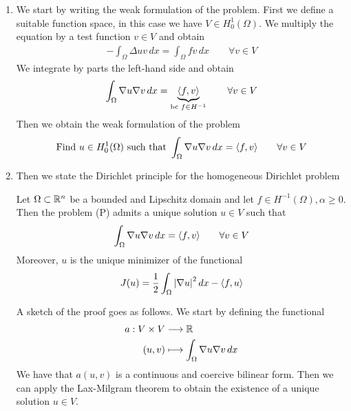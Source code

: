 \begin{enumerate}
    \item We start by writing the weak formulation of the problem. First we define a suitable function space, in this case we have \(V \in H^1_0(\Omega)\). We multiply the equation by a test function \(v \in V\) and obtain
    \[
        \begin{split}
            -\int_\Omega \Delta u v \, dx = \int_\Omega f v \, dx \qquad \forall v \in V
        \end{split}
    \]
    We integrate by parts the left-hand side and obtain
    \[
        \begin{split}
            \int_\Omega \nabla u \nabla v \, dx = \underbrace{\langle f, v \rangle}_{\text{bc } f \in H^{-1}} \qquad \forall v \in V
        \end{split}
    \]
    Then we obtain the weak formulation of the problem
    \[
        \begin{split}
            \text{Find } u \in H^1_0(\Omega) \text{ such that } \int_\Omega \nabla u \nabla v \, dx =  \langle f, v \rangle \qquad \forall v \in V
        \end{split}
    \]
    \item Then we state the Dirichlet principle for the homogeneous Dirichlet problem
    \begin{remark}
        Let \(\Omega \subset \mathbb{R}^n\) be a bounded and Lipschitz domain and let \(f \in H^{-1}(\Omega), \alpha \geq 0\). Then the problem (P) admits a unique solution \(u \in V\) such that 
        \[
            \int_\Omega \nabla u \nabla v \, dx = \langle f, v \rangle \qquad \forall v \in V
        \]
        Moreover, \(u\) is the unique minimizer of the functional
        \[
            J(u) = \frac{1}{2} \int_\Omega \abs{\nabla u}^2 \, dx - \langle f, u \rangle
        \]
    \end{remark}
    A sketch of the proof goes as follows. We start by defining the functional
    \begin{align*}
        a: V \times V &\longrightarrow \mathbb{R} \\
        (u, v) &\longmapsto \int_\Omega \nabla u \nabla v \, dx
    \end{align*}
    We have that \(a(u,v)\) is a continuous and coercive bilinear form. Then we can apply the Lax-Milgram theorem to obtain the existence of a unique solution \(u \in V\).


\end{enumerate}
